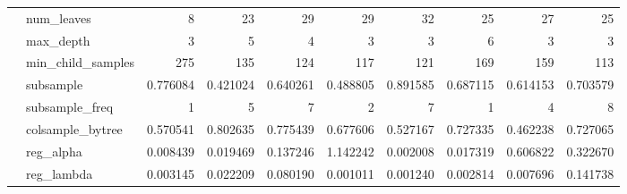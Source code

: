 \documentclass[12pt,twoside]{report}
\begin{document}
\begin{longtable}{llrrrrrrrr}
                                  & num\_leaves                & 8                        & 23                       & 29                       & 29                       & 32                       & 25                       & 27                       & 25                        \\*
                                  & max\_depth                 & 3                        & 5                        & 4                        & 3                        & 3                        & 6                        & 3                        & 3                         \\*
                                  & min\_child\_samples        & 275                      & 135                      & 124                      & 117                      & 121                      & 169                      & 159                      & 113                       \\*
                                  & subsample                  & 0.776084                 & 0.421024                 & 0.640261                 & 0.488805                 & 0.891585                 & 0.687115                 & 0.614153                 & 0.703579                  \\*
                                  & subsample\_freq            & 1                        & 5                        & 7                        & 2                        & 7                        & 1                        & 4                        & 8                         \\*
                                  & colsample\_bytree          & 0.570541                 & 0.802635                 & 0.775439                 & 0.677606                 & 0.527167                 & 0.727335                 & 0.462238                 & 0.727065                  \\*
                                  & reg\_alpha                 & 0.008439                 & 0.019469                 & 0.137246                 & 1.142242                 & 0.002008                 & 0.017319                 & 0.606822                 & 0.322670                  \\*
                                  & reg\_lambda                & 0.003145                 & 0.022209                 & 0.080190                 & 0.001011                 & 0.001240                 & 0.002814                 & 0.007696                 & 0.141738                  \\* 
\midrule

\end{longtable}
\end{document}
